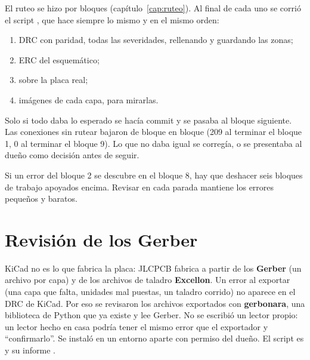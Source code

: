 El ruteo se hizo por bloques (capítulo~\ref{cap:ruteo}). Al final de cada uno se corrió
el script , que hace siempre lo mismo y en el mismo orden:
\begin{enumerate}
  \item DRC con paridad, todas las severidades, rellenando y guardando las zonas;
  \item ERC del esquemático;
  \item {} sobre la placa real;
  \item imágenes de cada capa, para mirarlas.
\end{enumerate}
Solo si todo daba lo esperado se hacía commit y se pasaba al bloque siguiente. Las conexiones sin rutear bajaron de
bloque en bloque (209 al terminar el bloque 1, 0 al terminar el bloque 9). Lo que no daba igual se corregía, o se
presentaba al dueño como decisión antes de seguir.

\begin{idea}
Si un error del bloque 2 se descubre en el bloque 8, hay que deshacer seis bloques de trabajo apoyados encima. Revisar
en cada parada mantiene los errores pequeños y baratos.
\end{idea}

\section{Revisión de los Gerber}\label{sec:c11-gerber}

KiCad no es lo que fabrica la placa: JLCPCB fabrica a partir de los \textbf{Gerber} (un archivo por capa) y de los
archivos de taladro \textbf{Excellon}. Un error al exportar (una capa que falta, unidades mal puestas, un taladro
corrido) no aparece en el DRC de KiCad. Por eso se revisaron los archivos exportados con
\textbf{gerbonara}, una biblioteca de Python que ya existe y lee Gerber. No se escribió un lector propio: un lector
hecho en casa podría tener el mismo error que el exportador y ``confirmarlo''. Se instaló en un entorno aparte con
permiso del dueño. El script es  y su informe .

